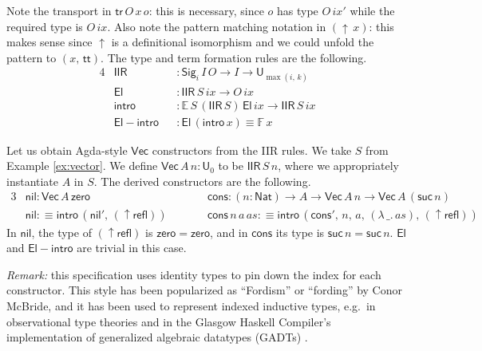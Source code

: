 \documentclass[acmsmall,screen,review]{acmart}
\newcommand{\mit}[1]{{\mathit{#1}}}
\newcommand{\msf}[1]{{\mathsf{#1}}}
\newcommand{\mbb}[1]{\mathbb{#1}}
\newcommand{\U}{\msf{U}}
\newcommand{\Nat}{\msf{Nat}}
\newcommand{\zero}{\msf{zero}}
\newcommand{\suc}{\msf{suc}}
\newcommand{\El}{\msf{El}}
\newcommand{\lup}{\uparrow}
\newcommand{\Sig}{\msf{Sig}}
\newcommand{\ttt}{\msf{tt}}
\newcommand{\ix}{{ix}}
\newcommand{\intro}{\msf{intro}}
\newcommand{\tr}{\msf{tr}}
\newcommand{\IIR}{\msf{IIR}}
\newcommand{\Vect}{\msf{Vec}}
\newcommand{\refl}{\msf{refl}}
\newcommand{\nil}{\msf{nil}}
\newcommand{\cons}{\msf{cons}}
\newcommand{\Elintro}{\msf{El\!\!-\!\!intro}}
\newcommand{\E}{\mbb{E}}
\newcommand{\F}{\mbb{F}}
\begin{document}
Note the transport in $\tr\,O\,x\,o$: this is necessary, since $o$ has type $O\,\ix'$ while the
required type is $O\,\ix$. Also note the pattern matching notation in $(\lup\,x)$: this makes sense
since $\lup$ is a definitional isomorphism and we could unfold the pattern to $(x,\,\ttt)$.  The
type and term formation rules are the following.
\begin{alignat*}{4}
  &\IIR               && : \Sig_i\,I\,O \to I \to \U_{\max(i,\,k)}\\
  &\El                && : \IIR\,S\,\ix \to O\,\ix\\
  &\intro             && : \E\,S\,(\IIR\,S)\,\El\,\ix \to \IIR\,S\,\ix\\
  &\msf{El\!\!-\!\!intro} && : \El\,(\intro\,x) \equiv \F\,x
\end{alignat*}

\begin{example}\label{ex:vector-constructors} Let us obtain Agda-style $\Vect$ constructors from the IIR rules. We take $S$ from Example \ref{ex:vector}. We define $\Vect\,A\,n : \U_0$ to be $\IIR\,S\,n$, where we appropriately instantiate $A$ in $S$. The derived constructors are the following.
  \begin{alignat*}{3}
    &\nil : \Vect\,A\,\zero                                && \cons : (n : \Nat) \to A \to \Vect\,A\,n \to \Vect\,A\,(\suc\,n)\\
    &\nil :\equiv \intro\,(\nil',\,(\lup\refl))\quad\quad  && \cons\,n\,a\,\mit{as} :\equiv \intro\,(\cons',\,n,\,a,\,(\lambda\,\_.\,\mit{as}),\,(\lup\refl))
  \end{alignat*}
  In $\nil$, the type of $(\lup\refl)$ is $\zero = \zero$, and in $\cons$ its type is $\suc\,n = \suc\,n$. $\El$ and $\Elintro$ are trivial in this case.
\end{example}

\emph{Remark:} this specification uses identity types to pin down the index for each
constructor. This style has been popularized as ``Fordism'' or ``fording'' by Conor McBride, and it
has been used to represent indexed inductive types, e.g.\ in observational type theories
\cite{towards-ott, DBLP:journals/toplas/PujetLT25} and in the Glasgow Haskell Compiler's
implementation of generalized algebraic datatypes (GADTs) \cite{vytiniotis2011outsidein}.
\end{document}

